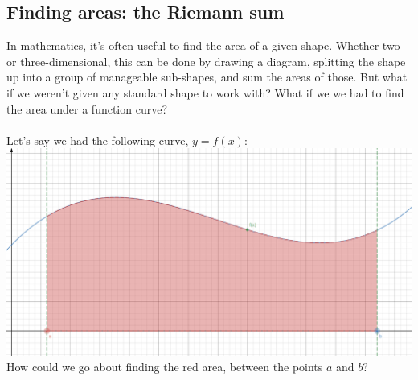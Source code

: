 \documentclass[11pt, leqno]{article}
\numberwithin{equation}{section}
\begin{document}
\subsection{Finding areas: the Riemann sum}
In mathematics, it's often useful to find the area of a given shape. Whether two- or three-dimensional, this can be done by drawing a diagram, splitting the shape up into a group of manageable sub-shapes, and sum the areas of those. But what if we weren't given any standard shape to work with? What if we we had to find the area under a function curve?\\ \\
Let's say we had the following curve, \(y = f(x)\): \\
\includegraphics[width=\textwidth]{AreaUnderCurve} \\
How could we go about finding the red area, between the points \(a\) and \(b\)?

\newpage
\end{document}
